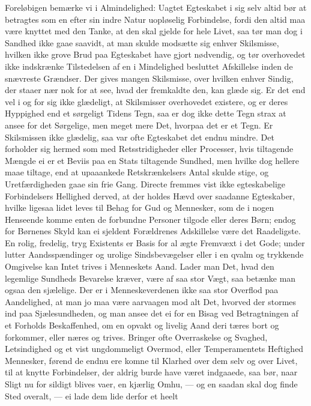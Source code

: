 \documentclass[12pt,a4paper]{book}
\newcommand{\apage}[1]{\marginnote{\footnotesize\textit{[#1]}}}
\begin{document}
Foreløbigen bemærke vi i Almindelighed: Uagtet Egteskabet i sig selv
altid bør at betragtes som en efter sin indre Natur uopløselig
Forbindelse, fordi den altid maa være knyttet med den Tanke, at den
skal gjelde for hele Livet, saa tør man dog i Sandhed ikke gaae saavidt,
at man skulde modsætte sig enhver Skilsmisse, hvilken ikke grove Brud
paa Egteskabet have gjort nødvendig, og tør overhovedet ikke indskrænke
Tilstedelsen af en i Mindelighed besluttet Afskillelse inden de
snævreste Grændser. Der gives mangen Skilsmisse, over hvilken enhver
Sindig, der staaer nær nok for at see, hvad der fremkaldte den, kan
glæde sig. Er det end vel i og for sig ikke glædeligt, at Skilsmisser
overhovedet existere, og er deres Hyppighed end et sørgeligt Tidens
Tegn, saa er dog ikke dette Tegn strax at ansee for det Sørgelige, men
meget mere Det, hvorpaa det er et Tegn. Er Skilsmissen ikke glædelig,
saa var ofte Egteskabet det endnu mindre. Det forholder sig \apage{136} hermed som
med Retsstridigheder eller Processer, hvis tiltagende Mængde ei er et
Beviis paa en Stats tiltagende Sundhed, men hvilke dog hellere maae
tiltage, end at upaaankede Retskrænkelsers Antal skulde stige, og
Uretfærdigheden gaae sin frie Gang. Directe fremmes vist ikke
egteskabelige Forbindelsers Hellighed derved, at der holdes Hævd over
saadanne Egteskaber, hvilke ligesaa lidet leves til Behag for Gud og
Mennesker, som de i nogen Henseende komme enten de forbundne Personer
tilgode eller deres Børn; endog for Børnenes Skyld kan ei sjeldent
Forældrenes Adskillelse være det Raadeligste. En rolig, fredelig, tryg
Existents er Basis for al ægte Fremvæxt i det Gode; under lutter
Aandsspændinger og urolige Sindsbevægelser eller i en qvalm og trykkende
Omgivelse kan Intet trives i Menneskets Aand. Lader man Det, hvad den
legemlige Sundheds Bevarelse kræver, være af saa stor Vægt, saa betænke
man ogsaa den sjælelige. Der er i Menneskeverdenen ikke saa stor
Overflod paa Aandelighed, at man jo maa være aarvaagen mod alt Det,
hvorved der stormes ind paa Sjælesundheden, og man ansee det ei for en
Bisag ved Betragtningen af et Forholds Beskaffenhed, om en opvakt og
livelig Aand deri tæres bort og forkommer, eller næres og trives.
Bringer ofte Overraskelse og Svaghed, Letsindighed og et vist
ungdommeligt Overmod, eller Temperamentets Heftighed Mennesker, førend
de endnu ere komne til Klarhed over dem selv og over Livet, til at
knytte Forbindelser, der \apage{137} aldrig burde have været indgaaede, saa bør,
naar Sligt nu for sildigt blives vaer, en kjærlig Omhu, --- og en saadan
skal dog finde Sted overalt, --- ei lade dem lide derfor et heelt
\end{document}
